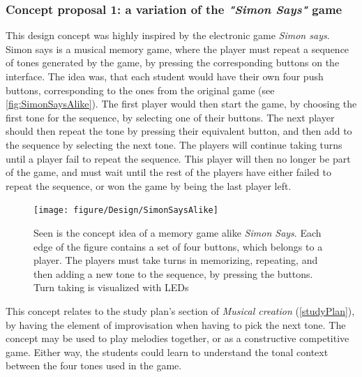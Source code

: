 \subsubsection{Concept proposal 1: a variation of the \textit{"Simon Says"} game }
This design concept was highly inspired by the electronic game \textit{Simon says}\cite{simonSays}. Simon says is a musical memory game, where the player must repeat a sequence of tones generated by the game, by pressing the corresponding buttons on the interface. The idea was, that each student would have their own four push buttons, corresponding to the ones from the original game (see \autoref{fig:SimonSaysAlike}). The first player would then start the game, by choosing the first tone for the sequence, by selecting one of their buttons. The next player should then repeat the tone by pressing their equivalent button, and then add to the sequence by selecting the next tone. The players will continue taking turns until a player fail to repeat the sequence. This player will then no longer be part of the game, and must wait until the rest of the players have either failed to repeat the sequence, or won the game by being the last player left.

\begin{figure}[H]
	\centering
	\texttt{[image: figure/Design/SimonSaysAlike]} 
	\caption{Seen is the concept idea of a memory game alike \textit{Simon Says}. Each edge of the figure contains a set of four buttons, which belongs to a player. The players must take turns in memorizing, repeating, and then adding a new tone to the sequence, by pressing the buttons. Turn taking is visualized with LEDs}
	\label{fig:SimonSaysAlike}
\end{figure}

This concept relates to the study plan's section of \textit{Musical creation }(\ref{studyPlan}), by having the element of improvisation when having to pick the next tone. The concept may be used to play melodies together, or as a constructive competitive game. Either way, the students could learn to understand the tonal context between the four tones used in the game.   

